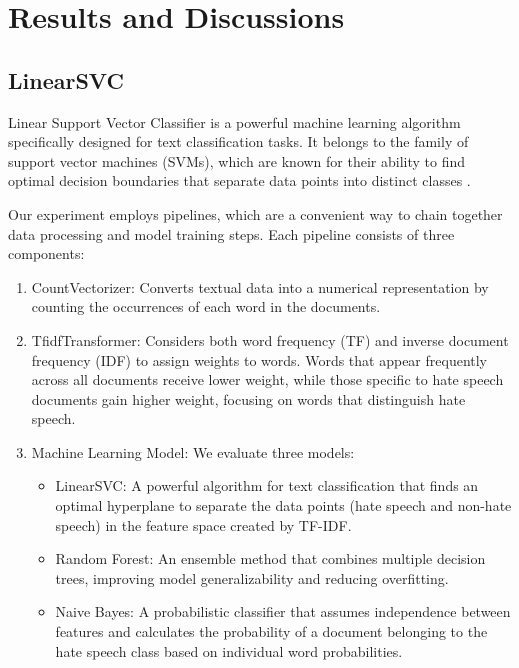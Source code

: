 \documentclass{article}
\begin{document}
\section*{Results and Discussions}
\subsection*{LinearSVC }
Linear Support Vector Classifier is a powerful machine learning algorithm specifically designed for text classification tasks. It belongs to the family of support vector machines (SVMs), which are known for their ability to find optimal decision boundaries that separate data points into distinct classes \cite{scikit-learn}.


Our experiment employs pipelines, which are a convenient way to chain together data processing and model training steps. Each pipeline consists of three components:
\begin{enumerate}
    \item CountVectorizer: Converts textual data into a numerical representation by counting the occurrences of each word in the documents.
    \item TfidfTransformer: Considers both word frequency (TF) and inverse document frequency (IDF) to assign weights to words. Words that appear frequently across all documents receive lower weight, while those specific to hate speech documents gain higher weight, focusing on words that distinguish hate speech.
    \item Machine Learning Model: We evaluate three models:
        \begin{itemize}
            \item LinearSVC: A powerful algorithm for text classification that finds an optimal hyperplane to separate the data points (hate speech and non-hate speech) in the feature space created by TF-IDF.
            \item Random Forest: An ensemble method that combines multiple decision trees, improving model generalizability and reducing overfitting.
            \item Naive Bayes: A probabilistic classifier that assumes independence between features and calculates the probability of a document belonging to the hate speech class based on individual word probabilities.
        \end{itemize}
\end{enumerate}
\end{document}
